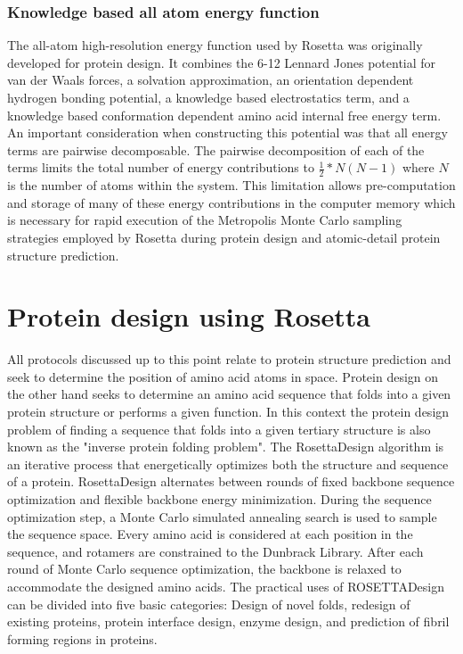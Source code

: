 \subsubsection{Knowledge based all atom energy function}
The all-atom high-resolution energy function used by Rosetta was originally developed for protein design\citep{Kuhlman:2000tc,Kuhlman:2003kp}.
It combines the 6-12 Lennard Jones potential for van der Waals forces, a solvation approximation\citep{Lazaridis:1999wi}, an orientation dependent hydrogen bonding potential\citep{Kortemme:2003td}, a knowledge based electrostatics term, and a knowledge based conformation dependent amino acid internal free energy term\citep{Dunbrack:1993jt}.
An important consideration when constructing this potential was that all energy terms are pairwise decomposable.
The pairwise decomposition of each of the terms limits the total number of energy contributions to $\frac{1}{2}*N(N-1)$ where $N$ is the number of atoms within the system.
This limitation allows pre-computation and storage of many of these energy contributions in the computer memory which is necessary for rapid execution of the Metropolis Monte Carlo sampling strategies employed by Rosetta during protein design and atomic-detail protein structure prediction.

\section{Protein design using Rosetta}
All protocols discussed up to this point relate to protein structure prediction and seek to determine the position of amino acid atoms in space.
Protein design on the other hand seeks to determine an amino acid sequence that folds into a given protein structure or performs a given function.
In this context the protein design problem of finding a sequence that folds into a given tertiary structure is also known as the "inverse protein folding problem".
The RosettaDesign\citep{Kuhlman:2003kp} algorithm is an iterative process that energetically optimizes both the structure and sequence of a protein.
RosettaDesign alternates between rounds of fixed backbone sequence optimization and flexible backbone energy minimization\citep{Kuhlman:2003kp}.
During the sequence optimization step, a Monte Carlo simulated annealing search is used to sample the sequence space.
Every amino acid is considered at each position in the sequence, and rotamers are constrained to the Dunbrack Library\citep{Dunbrack:1993jt}.
After each round of Monte Carlo sequence optimization, the backbone is relaxed to accommodate the designed amino acids\citep{Kuhlman:2003kp}.
The practical uses of ROSETTADesign can be divided into five basic categories: Design of novel folds\citep{Kuhlman:2003kp}, redesign of existing proteins\citep{Korkegian:2005it}, protein interface design, enzyme design\citep{Jiang:2008jk}, and prediction of fibril forming regions in proteins\citep{Thompson:2006cj}.

